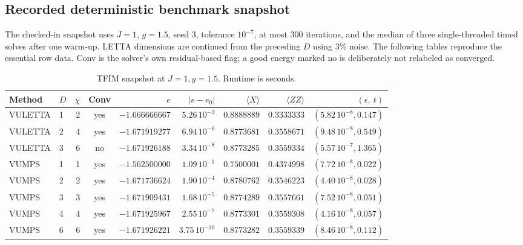 \documentclass[11pt]{article}
\begin{document}
\subsection{Recorded deterministic benchmark snapshot}

The checked-in snapshot uses $J=1$, $g=1.5$, seed $3$, tolerance $10^{-7}$,
at most $300$ iterations, and the median of three single-threaded timed
solves after one warm-up.  LETTA dimensions are continued from the preceding
$D$ using $3\%$ noise.  The following tables reproduce the essential row
data.  Conv is the solver's own residual-based flag; a good energy marked no
is deliberately not relabeled as converged.

\begin{table}[H]
  \centering
  \caption{TFIM snapshot at $J=1,g=1.5$.  Runtime is seconds.}
  \label{tab:tfim-benchmark}
  \scriptsize
  \begin{tabular}{@{}llrcrrrrr@{}}
    \toprule
    Method & $D$ & $\chi$ & Conv & $e$ & $|e-e_0|$ &
      $\langle X\rangle$ & $\langle ZZ\rangle$ & $(\epsilon,\ t)$ \\
    \midrule
    VULETTA & 1 & 2 & yes & $-1.666666667$ & $5.26\,10^{-3}$ &
      $0.8888889$ & $0.3333333$ & $(5.82\,10^{-8},0.147)$ \\
    VULETTA & 2 & 4 & yes & $-1.671919277$ & $6.94\,10^{-6}$ &
      $0.8773681$ & $0.3558671$ & $(9.48\,10^{-8},0.549)$ \\
    VULETTA & 3 & 6 & no & $-1.671926188$ & $3.34\,10^{-8}$ &
      $0.8773285$ & $0.3559334$ & $(5.57\,10^{-7},1.365)$ \\
    \midrule
    VUMPS & 1 & 1 & yes & $-1.562500000$ & $1.09\,10^{-1}$ &
      $0.7500001$ & $0.4374998$ & $(7.72\,10^{-8},0.022)$ \\
    VUMPS & 2 & 2 & yes & $-1.671736624$ & $1.90\,10^{-4}$ &
      $0.8780762$ & $0.3546223$ & $(4.40\,10^{-8},0.028)$ \\
    VUMPS & 3 & 3 & yes & $-1.671909431$ & $1.68\,10^{-5}$ &
      $0.8774289$ & $0.3557661$ & $(7.52\,10^{-8},0.051)$ \\
    VUMPS & 4 & 4 & yes & $-1.671925967$ & $2.55\,10^{-7}$ &
      $0.8773301$ & $0.3559308$ & $(4.16\,10^{-8},0.057)$ \\
    VUMPS & 6 & 6 & yes & $-1.671926221$ & $3.75\,10^{-10}$ &
      $0.8773282$ & $0.3559339$ & $(8.46\,10^{-8},0.112)$ \\
    \bottomrule
  \end{tabular}
\end{table}
\end{document}
